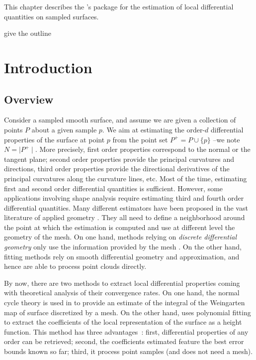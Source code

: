 


This chapter describes the \cgal's package for the estimation of local 
differential quantities on sampled surfaces. 

give the outline
 
\section{Introduction}
\label{sec:intro}

\subsection{Overview}

Consider a sampled smooth surface, and assume we are given a
collection of points $P$ about a given sample $p$. We aim at
estimating the order-$d$ differential properties of the surface at
point $p$ from the point set $P^+ = P\cup \{ p\}$ --we note $N=\mid
P^+\mid$. More precisely, first order properties correspond to the
normal or the tangent plane; second order properties provide the
principal curvatures and directions, third order properties provide
the directional derivatives of the principal curvatures along the
curvature lines, etc.  Most of the time, estimating first and second
order differential quantities is sufficient.  However, some
applications involving shape analysis require estimating third and
fourth order differential quantities.
Many different estimators have been proposed in the vast literature of
applied geometry \cite{sp-smrqtm-01}. They all need to define a
neighborhood around the point at which the estimation is computed and
use at different level the geometry of the mesh. On one hand, methods
relying on {\em discrete differential geometry} only use the
information provided by the mesh
\cite{pinkall93a,desbrun00a,dcs-jmm-rdtnc-03}. On the other hand,
fitting methods rely on smooth differential geometry and
approximation, and hence are able to process point clouds directly.

By now, there are two methods to extract local differential properties
coming with theoretical analysis of their convergence rates. On one
hand, the normal cycle theory is used in
\cite{dcs-jmm-rdtnc-03} to provide an estimate of the integral of the
Weingarten map of surface discretized by a mesh.  On the other hand,
\cite{fc-mp-edqpfoj-05} uses polynomial fitting to extract the
coefficients of the local representation of the surface as a height
function. This method has three advantages~: first, differential
properties of any order can be retrieved; second, the coefficients
estimated feature the best error bounds known so far; third, it
process point samples (and does not need a mesh).



